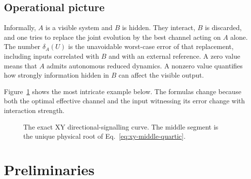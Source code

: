 \documentclass[11pt,a4paper]{article}
\theoremstyle{remark}
\begin{document}
\subsection*{Operational picture}

Informally, $A$ is a visible system and $B$ is hidden.  They interact, $B$ is
discarded, and one tries to replace the joint evolution by the best channel
acting on $A$ alone.  The number $\delta_A(U)$ is the unavoidable worst-case
error of that replacement, including inputs correlated with $B$ and with an
external reference.  A zero value means that $A$ admits autonomous reduced
dynamics.  A nonzero value quantifies how strongly information hidden in $B$
can affect the visible output.

Figure~\ref{fig:xy-curve} shows the most intricate example below.  The formulas
change because both the optimal effective channel and the input witnessing its
error change with interaction strength.

\begin{figure}[ht]
\centering
{}
\caption{The exact XY directional-signalling curve.  The middle segment is the
unique physical root of Eq.~\eqref{eq:xy-middle-quartic}.}
\label{fig:xy-curve}
\end{figure}

\section{Preliminaries}
\end{document}

